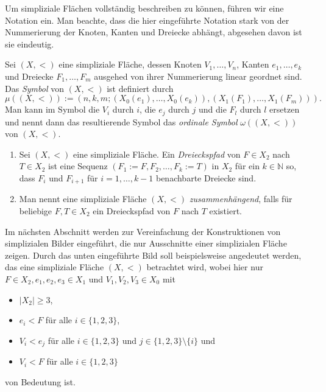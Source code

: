 \documentclass[12pt,titlepage]{article}
\begin{document}
Um simpliziale Flächen vollständig beschreiben zu können, führen wir eine Notation ein. Man beachte, dass die hier eingeführte Notation stark von der Nummerierung der Knoten, Kanten und Dreiecke abhängt, abgesehen davon ist sie eindeutig.
\begin{definition}
 Sei $(X,<)$ eine simpliziale Fläche, dessen Knoten $V_{1},\ldots,V_{n}$, Kanten $e_{1},\ldots,e_{k}$ und Dreiecke $F_{1},\ldots,F_{m}$ ausgehed von ihrer Nummerierung linear geordnet sind. Das \emph{Symbol} von $(X,<)$ ist definiert durch 
\[
\mu((X,<)):=(n,k,m;(X_{0}(e_{1}),\ldots,X_{0}(e_{k})),(X_{1}(F_{1}),\ldots,X_{1}(F_{m}))).
\]
Man kann im Symbol die $V_{i}$ durch $i$, die $e_{j}$ durch $j$ und die $F_{l}$ durch $l$ ersetzen und nennt dann das resultierende Symbol das \emph{ordinale Symbol} $\omega((X,<))$ von $(X,<)$.
\end{definition}
\begin{definition} 
\begin{enumerate}
\item Sei $(X,<)$ eine simpliziale Fläche. Ein \emph{Dreieckspfad} von $F\in X_{2}$ nach $T \in X_{2}$ ist eine Sequenz $(F_{1}:=F,F_{2},\ldots,F_{k}:=T)$ in $X_{2}$ für ein $k \in \mathbb{N}$ so, dass $F_{i} $ und $F_{i+1}$ für $i=1,\ldots,k-1$ benachbarte Dreiecke sind.
\item Man nennt eine simpliziale Fläche $(X,<)$ \emph{zusammenhängend}, falls für beliebige $F,T \in X_{2}$ ein Dreieckspfad von $F$ nach $T$ existiert.
\end {enumerate}
\end{definition}

Im nächsten Abschnitt werden zur Vereinfachung der Konstruktionen von simplizialen Bilder eingeführt, die nur Ausschnitte einer simplizialen Fläche zeigen. Durch das unten eingeführte Bild soll beispielsweise angedeutet werden, das eine simpliziale Fläche $(X,<)$ betrachtet wird, wobei hier nur $F\in X_2,e_1,e_2,e_3\in X_1$ und $V_1,V_2,V_3 \in X_0$ mit 
\begin{itemize}
 \item $\vert X_{2}\vert \geq 3$,
 \item $e_{i} < F$ für alle $i \in \{1,2,3\}$,
 \item $V_{i}<e_{j}$ für alle $i \in \{1,2,3\}$ und $j \in \{1,2,3\} \setminus\{i\}$ und
 \item $V_{i} < F$ für alle $i \in \{1,2,3\}$
\end{itemize}  
von Bedeutung ist.\\
\end{document}
